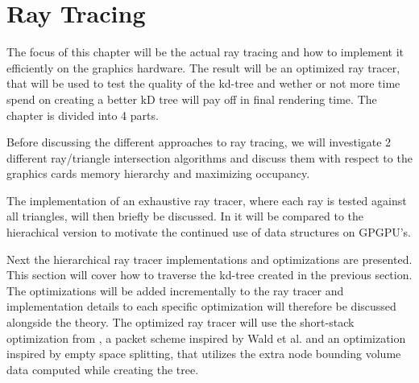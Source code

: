 


\chapter{Ray Tracing}\label{chp:rayTracing}




The focus of this chapter will be the actual ray tracing and how to
implement it efficiently on the graphics hardware. The result will be
an optimized ray tracer, that will be used to test the quality of the
kd-tree and wether or not more time spend on creating a better kD tree
will pay off in final rendering time. The chapter is divided into 4
parts.

Before discussing the different approaches to ray tracing, we will
investigate 2 different ray/triangle intersection algorithms and
discuss them with respect to the graphics cards memory hierarchy and
maximizing occupancy.

The implementation of an exhaustive ray tracer, where each ray is
tested against all triangles, will then briefly be discussed. In
 it will be compared to the hierachical
version to motivate the continued use of data structures on GPGPU's.

Next the hierarchical ray tracer implementations and optimizations are
presented. This section will cover how to traverse the kd-tree created
in the previous section. The optimizations will be added incrementally
to the ray tracer and implementation details to each specific
optimization will therefore be discussed alongside the theory. The
optimized ray tracer will use the short-stack optimization from \horn,
a packet scheme inspired by Wald et al. and
an optimization inspired by empty space splitting, that utilizes the
extra node bounding volume data computed while creating the tree.

